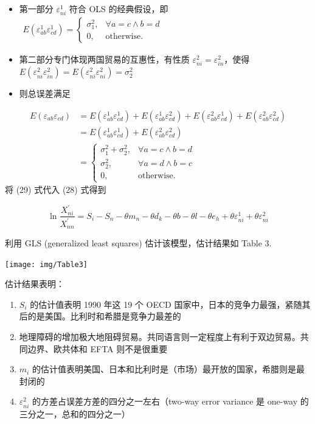 \documentclass[
]{article}
\providecommand{\tightlist}{%
  \setlength{\itemsep}{0pt}\setlength{\parskip}{0pt}}
\begin{document}
\begin{itemize}
\item
  第一部分 \(\varepsilon_{ni}^1\) 符合 OLS 的经典假设，即 \(\begin{aligned}E(\varepsilon_{ab}^1\varepsilon_{cd}^1) = \left\{\begin{matrix} \sigma_1^2, & \forall a=c \land b=d\\ 0, & \text{otherwise.} \end{matrix}\right.\end{aligned}\)
\item
  第二部分专门体现两国贸易的互惠性，有性质 \(\varepsilon_{ni}^2=\varepsilon_{in}^2\)，使得 \(E(\varepsilon_{ni}^2\varepsilon_{in}^2)= E(\varepsilon_{ni}^2\varepsilon_{ni}^2) =\sigma_2^2\)
\item
  则总误差满足
\end{itemize}

\[
\begin{aligned}
E(\varepsilon_{ab}\varepsilon_{cd}) & = E(\varepsilon_{ab}^1\varepsilon_{cd}^1)+E(\varepsilon_{ab}^1\varepsilon_{cd}^2)+E(\varepsilon_{ab}^2\varepsilon_{cd}^1)+E(\varepsilon_{ab}^2\varepsilon_{cd}^2) \\ 
& = E(\varepsilon_{ab}^1\varepsilon_{cd}^1)+E(\varepsilon_{ab}^2\varepsilon_{cd}^2) \\ 
& = \left\{\begin{matrix}\sigma_1^2+\sigma_2^2, & \forall a  = c \land  b  = d  \\
         \sigma_2^2, & \forall a  = d \land b  = c\\
        0, & \text{otherwise.}
        \end{matrix}\right.
\end{aligned}
\]
将 (29) 式代入 (28) 式得到

\[
\ln \frac{X_{n i}^{\prime}}{X_{n n}^{\prime}}=S_{i}-S_{n}-\theta m_{n}-\theta d_{k}-\theta b-\theta l-\theta e_{h}+\theta \varepsilon_{n i}^{1}+\theta \varepsilon_{n i}^{2} \tag{30}
\]

利用 GLS (generalized least squares) 估计该模型，估计结果如 Table 3.

\begin{center}\texttt{[image: img/Table3]} \end{center}

估计结果表明：

\begin{enumerate}
\def\labelenumi{\arabic{enumi}.}
\tightlist
\item
  \(S_i\) 的估计值表明 1990 年这 19 个 OECD 国家中，日本的竞争力最强，紧随其后的是美国。比利时和希腊是竞争力最差的
\item
  地理障碍的增加极大地阻碍贸易。共同语言则一定程度上有利于双边贸易。共同边界、欧共体和 EFTA 则不是很重要
\item
  \(m_i\) 的估计值表明美国、日本和比利时是（市场）最开放的国家，希腊则是最封闭的
\item
  \(\varepsilon_{ni}^2\) 的方差占误差方差的四分之一左右（two-way error variance 是 one-way 的三分之一，总和的四分之一）
\end{enumerate}
\end{document}
